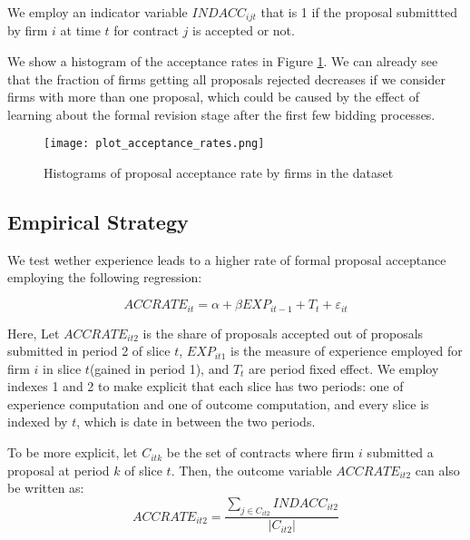 We employ an indicator variable $INDACC_{ijt}$ that is 1 if the proposal submittted by firm $i$ at time $t$ for contract $j$ is accepted or not.

We show a histogram of the acceptance rates in Figure \ref{fig:plot_acceptance_rates}. We can already see that the fraction of firms getting all proposals rejected decreases if we consider firms with more than one proposal, which could be caused by the effect of learning about the formal revision stage after the first few bidding processes.

\begin{figure}
  \texttt{[image: plot\_acceptance\_rates.png]}
  \caption{Histograms of proposal acceptance rate by firms in the dataset}
  \label{fig:plot_acceptance_rates}
\end{figure}

\subsection{Empirical Strategy}
We test wether experience leads to a higher rate of formal proposal acceptance employing the following regression:

\begin{equation}
\label{eqn:olsspec}
ACCRATE_{it}=\alpha+ \beta EXP_{it-1}+T_t+\varepsilon_{it}
\end{equation}

Here, Let $ACCRATE_{it2}$ is the share of proposals accepted out of proposals submitted in period 2 of slice $t$, $EXP_{it1} $ is the measure of experience employed for firm $i$ in slice $t$(gained in period 1), and $T_t$ are period fixed effect. We employ indexes 1 and 2 to make explicit that each slice has two periods: one of experience computation and one of outcome computation, and every slice is indexed by $t$, which is date in between the two periods.

To be more explicit, let $C_{itk}$ be the set of contracts where firm $i$ submitted a proposal at period $k$ of slice $t$. Then, the outcome variable $ACCRATE_{it2}$ can also be written as:
$$  ACCRATE_{it2}=\dfrac{\sum_{j\in C_{it2}}INDACC_{it2}}{|C_{it2}|}$$


